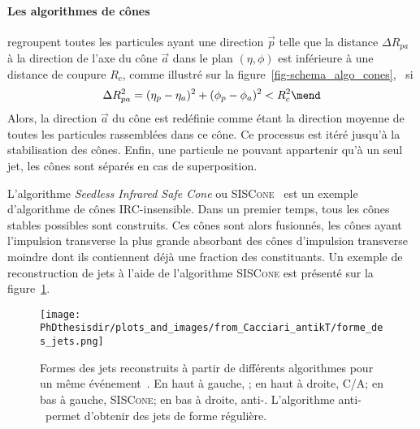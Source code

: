 \paragraph{Les algorithmes de cônes} regroupent toutes les particules ayant une direction $\vec{p}$ telle que la distance $\Delta R_{pa}$ à la direction de l'axe du cône $\vec{a}$ dans le plan $(\eta,\phi)$ est inférieure à une distance de coupure $R_c$, comme illustré sur la figure~\ref{fig-schema_algo_cones}, \ie\ si
\begin{equation}
\Delta R_{pa} ^2 = (\eta_p - \eta_a)^2 + (\phi_p - \phi_a)^2 < R_c^2
\mend
\end{equation}
Alors, la direction $\vec{a}$ du cône est redéfinie comme étant la direction moyenne de toutes les particules rassemblées dans ce cône. Ce processus est itéré jusqu'à la stabilisation des cônes.
Enfin, une particule ne pouvant appartenir qu'à un seul jet, les cônes sont séparés en cas de superposition.
\par L'algorithme \emph{Seedless Infrared Safe Cone} ou \textsc{SISCone}~\cite{SISCone} est un exemple d'algorithme de cônes IRC-insensible.
Dans un premier temps, tous les cônes stables possibles sont construits.
Ces cônes sont alors fusionnés, les cônes ayant l'impulsion transverse la plus grande absorbant des cônes d'impulsion transverse moindre dont ils contiennent déjà une fraction des constituants.
Un exemple de reconstruction de jets à l'aide de l'algorithme \textsc{SISCone} est présenté sur la figure~\ref{fig-chapter-CMS-section-jets_reco-subsec-algo-examples}.
\begin{figure}[b]
\centering
\texttt{[image: \\PhDthesisdir/plots\_and\_images/from\_Cacciari\_antikT/forme\_des\_jets.png]}
\caption[Formes des jets reconstruits à partir de différents algorithmes.]{Formes des jets reconstruits à partir de différents algorithmes pour un même événement~\cite{Cacciari_antikT}. En haut à gauche, \kT; en haut à droite, C/A; en bas à gauche, \textsc{SISCone}; en bas à droite, anti-\kT. L'algorithme anti-\kT\ permet d'obtenir des jets de forme régulière.}
\label{fig-chapter-CMS-section-jets_reco-subsec-algo-examples}
\end{figure}
